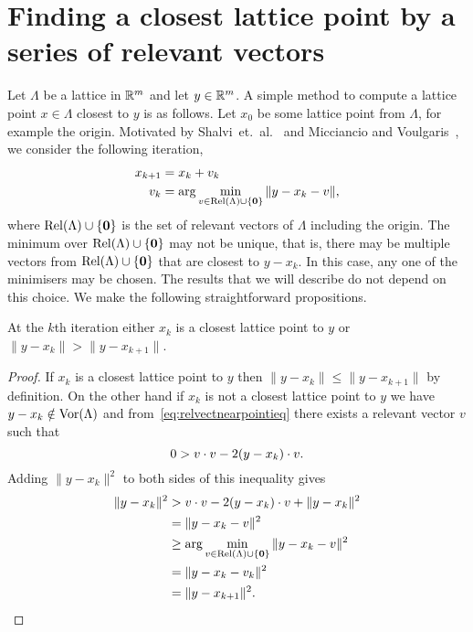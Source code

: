 \documentclass[final,leqno]{siamltex}
\begin{document}
\section{Finding a closest lattice point by a series of relevant vectors} \label{sec:iterative-slicer}

Let $\Lambda$ be a lattice in ${\mathbb R}^m$ and let $y \in {\mathbb R}^m$. A simple method to compute a lattice point $x \in \Lambda$ closest to $y$ is as follows.  Let $x_0$ be some lattice point from $\Lambda$, for example the origin.  Motivated by Shalvi~et.~al.~\cite{Shalvi_iterativeslicer_2009} and  Micciancio and Voulgaris~\cite{MicciancioVoulgaris_deterministic_jv_2013}, we consider the following iteration,
\begin{align}
x_{k+1} &= x_k + v_k \nonumber \\
v_k &= \arg\min_{ v \in \relevant(\Lambda) \cup \{\zerobf\} } \|y - x_k - v \|, \label{eq:relvectsminimslicer}
\end{align} 
where $\operatorname{Rel}(\Lambda) \cup \{\boldsymbol{0}\}$ is the set of relevant vectors of $\Lambda$ including the origin.  The minimum over $\operatorname{Rel}(\Lambda) \cup \{\boldsymbol{0}\}$ may not be unique, that is, there may be multiple vectors from $\operatorname{Rel}(\Lambda) \cup \{\boldsymbol{0}\}$ that are closest to $y - x_k$.  In this case, any one of the minimisers may be chosen.  The results that we will describe do not depend on this choice. We make the following straightforward propositions.

\begin{proposition}\label{obs:1}
At the $k$th iteration either $x_k$ is a closest lattice point to $y$ or $\|y - x_k\| > \| y - x_{k+1} \|$.
\end{proposition}
\begin{proof}
If $x_k$ is a closest lattice point to $y$ then $\|y - x_k\| \leq \| y - x_{k+1} \|$ by definition.  On the other hand if $x_k$ is not a closest lattice point to $y$ we have $y - x_k \notin \operatorname{Vor}(\Lambda)$ and from~\eqref{eq:relvectnearpointieq} there exists a relevant vector $v$ such that
\[
0 > v \cdot v - 2(y - x_k) \cdot v.
\]
Adding $\|y - x_k\|^2$ to both sides of this inequality gives
\begin{align*}
\|y - x_k\|^2 &> v \cdot v - 2(y - x_k) \cdot v + \|y - x_k\|^2 \\
&= \|y - x_k - v\|^2 \\
&\geq \arg\min_{ v \in \operatorname{Rel}(\Lambda) \cup \{\boldsymbol{0}\}}\|y - x_k - v \|^2 \\
&= \|y - x_k - v_k \|^2 \\
&= \|y - x_{k+1}\|^2. 
\end{align*}
\end{proof} 
\end{document}
